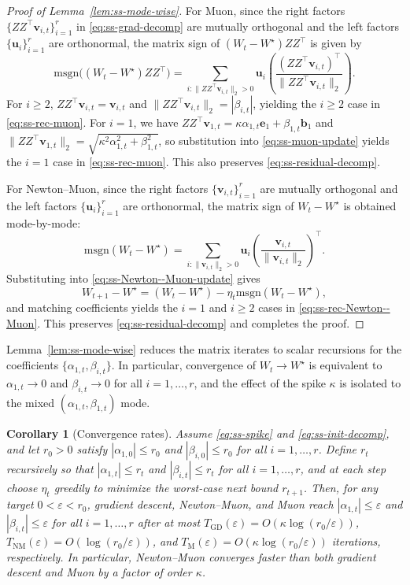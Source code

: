 \documentclass[11pt]{article}
\newtheorem{corollary}{Corollary}
\begin{document}
\begin{proof}[Proof of Lemma~\ref{lem:ss-mode-wise}]
For Muon, since the right factors $\{ZZ^\top\boldsymbol{v}_{i,t}\}_{i=1}^r$ in \eqref{eq:ss-grad-decomp} are mutually orthogonal and the left factors $\{\boldsymbol{u}_i\}_{i=1}^r$ are orthonormal, the matrix sign of $(W_t-W^\star)ZZ^\top$ is given by
\[
\mathrm{msgn}\big((W_t-W^\star)ZZ^\top\big)
=
\sum_{i:\|ZZ^\top\boldsymbol{v}_{i,t}\|_2>0}
\boldsymbol{u}_i
\left(\frac{(ZZ^\top\boldsymbol{v}_{i,t})^\top}{\|ZZ^\top\boldsymbol{v}_{i,t}\|_2}\right).
\]
For $i\ge 2$, $ZZ^\top\boldsymbol{v}_{i,t}=\boldsymbol{v}_{i,t}$ and $\|ZZ^\top\boldsymbol{v}_{i,t}\|_2=|\beta_{i,t}|$, yielding the $i\ge 2$ case in \eqref{eq:ss-rec-muon}. For $i=1$, we have
$ZZ^\top\boldsymbol{v}_{1,t}=\kappa\alpha_{1,t}\boldsymbol{e}_1+\beta_{1,t}\boldsymbol{b}_1$ and
$\|ZZ^\top\boldsymbol{v}_{1,t}\|_2=\sqrt{\kappa^2\alpha_{1,t}^2+\beta_{1,t}^2}$, so substitution into \eqref{eq:ss-muon-update} yields the $i=1$ case in \eqref{eq:ss-rec-muon}. This also preserves \eqref{eq:ss-residual-decomp}.

For Newton--Muon, since the right factors $\{\boldsymbol{v}_{i,t}\}_{i=1}^r$ are mutually orthogonal and the left factors $\{\boldsymbol{u}_i\}_{i=1}^r$ are orthonormal, the matrix sign of $W_t-W^\star$ is obtained mode-by-mode:
\[
\mathrm{msgn}(W_t-W^\star)
=
\sum_{i:\|\boldsymbol{v}_{i,t}\|_2>0}
\boldsymbol{u}_i
\left(\frac{\boldsymbol{v}_{i,t}}{\|\boldsymbol{v}_{i,t}\|_2}\right)^\top.
\]
Substituting into \eqref{eq:ss-Newton--Muon-update} gives
\[
W_{t+1}-W^\star
=
(W_t-W^\star)-\eta_t\mathrm{msgn}(W_t-W^\star),
\]
and matching coefficients yields the $i=1$ and $i\ge 2$ cases in \eqref{eq:ss-rec-Newton--Muon}. This preserves \eqref{eq:ss-residual-decomp} and completes the proof.
\end{proof}

Lemma~\ref{lem:ss-mode-wise} reduces the matrix iterates to scalar recursions for the coefficients $\{\alpha_{1,t},\beta_{i,t}\}$. In particular, convergence of $W_t\to W^\star$ is equivalent to $\alpha_{1,t}\to 0$ and $\beta_{i,t}\to 0$ for all $i=1,\dots,r$, and the effect of the spike $\kappa$ is isolated to the mixed $(\alpha_{1,t},\beta_{1,t})$ mode.

\begin{corollary}[Convergence rates]
\label{cor:ss-rates}
Assume \eqref{eq:ss-spike} and \eqref{eq:ss-init-decomp}, and let $r_0>0$ satisfy $|\alpha_{1,0}|\le r_0$ and $|\beta_{i,0}|\le r_0$ for all $i=1,\dots,r$. Define $r_t$ recursively so that $|\alpha_{1,t}|\le r_t$ and $|\beta_{i,t}|\le r_t$ for all $i=1,\dots,r$, and at each step choose $\eta_t$ greedily to minimize the worst-case next bound $r_{t+1}$. Then, for any target $0<\varepsilon<r_0$, gradient descent, Newton--Muon, and Muon reach $|\alpha_{1,t}|\le \varepsilon$ and $|\beta_{i,t}|\le \varepsilon$ for all $i=1,\dots,r$ after at most $T_{\mathrm{GD}}(\varepsilon)=O(\kappa\log(r_0/\varepsilon))$, $T_{\mathrm{NM}}(\varepsilon)=O(\log(r_0/\varepsilon))$, and $T_{\mathrm{M}}(\varepsilon)=O(\kappa\log(r_0/\varepsilon))$ iterations, respectively. In particular, Newton--Muon converges faster than both gradient descent and Muon by a factor of order $\kappa$.
\end{corollary}
\end{document}
